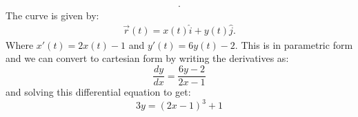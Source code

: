 \begin{itemize}
\begin{example}
\begin{align*}
		.\end{align*}
		The curve is given by:
		\begin{align*}
			\vec{r}\left( t \right)  = x\left( t \right) \hat{i} + y\left( t \right) \hat{j}
		.\end{align*}
		Where $x'\left( t \right)  = 2x\left( t \right) -1$ and $y'\left( t \right)  = 6y\left( t \right) -2$. This is in parametric form and we can convert to cartesian form by writing the derivatives as:
		\begin{equation}
			\frac{dy}{dx} = \frac{6y-2}{2x-1}
		\end{equation}
		and solving this differential equation to get:
		\begin{equation}
			3y = \left( 2x-1 \right) ^3 + 1
		\end{equation}
	\end{example}
\end{itemize}
